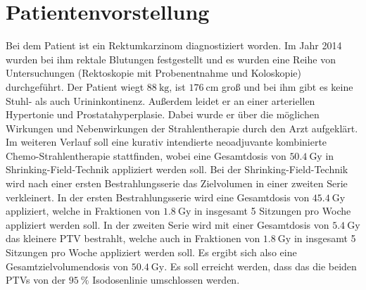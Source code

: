\section{Patientenvorstellung}
\label{sec:Durchführung}
Bei dem Patient ist ein Rektumkarzinom diagnostiziert worden. Im Jahr 2014 wurden bei ihm rektale Blutungen festgestellt und es wurden eine Reihe von Untersuchungen (Rektoskopie mit Probenentnahme und Koloskopie) durchgeführt. 
Der Patient wiegt $\SI{88}{\kilogram}$, ist $\SI{176}{\centi\meter}$ groß und bei ihm gibt es keine Stuhl- als auch Urininkontinenz. Außerdem leidet er an einer arteriellen Hypertonie und Prostatahyperplasie. Dabei wurde er über die möglichen Wirkungen und Nebenwirkungen der Strahlentherapie durch den Arzt aufgeklärt. 
Im weiteren Verlauf soll eine kurativ intendierte neoadjuvante kombinierte Chemo-Strahlentherapie stattfinden, wobei eine Gesamtdosis von $\SI{50,4}{\gray}$ in
Shrinking-Field-Technik appliziert werden soll. Bei der Shrinking-Field-Technik wird nach einer ersten Bestrahlungsserie das Zielvolumen in einer zweiten Serie verkleinert.
In der ersten Bestrahlungsserie wird eine Gesamtdosis von $\SI{45,4}{\gray}$ appliziert, welche in Fraktionen von $\SI{1,8}{\gray}$ in insgesamt 5 Sitzungen pro Woche appliziert werden soll.
In der zweiten Serie wird mit einer Gesamtdosis von $\SI{5,4}{\gray}$ das kleinere PTV bestrahlt, welche auch in Fraktionen von $\SI{1,8}{\gray}$ in insgesamt 5 Sitzungen pro Woche appliziert werden soll. Es ergibt sich also eine Gesamtzielvolumendosis von $\SI{50,4}{\gray}$.
Es soll erreicht werden, dass das die beiden PTVs von der $\SI{95}{\percent}$ Isodosenlinie umschlossen werden. 